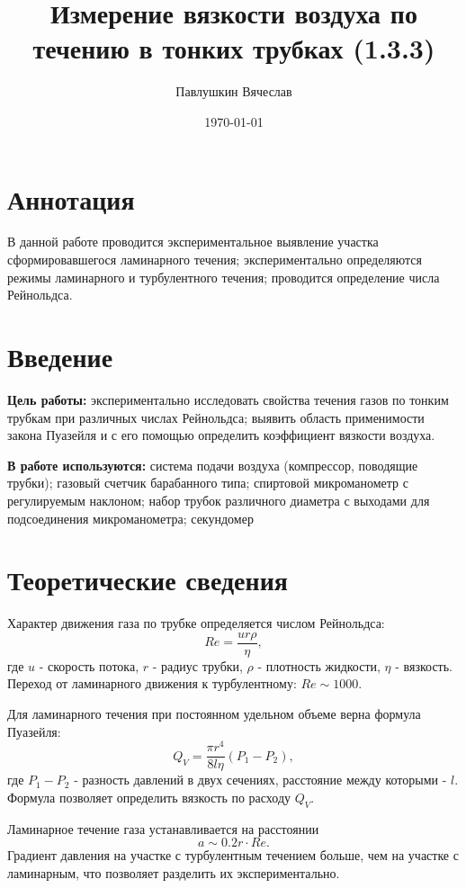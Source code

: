 \documentclass[a4paper,12pt]{article}
\title{Измерение вязкости воздуха по течению в тонких трубках (1.3.3)}
\author{Павлушкин Вячеслав}
\date{\today}
\theoremstyle{definition}
\begin{document}
	\maketitle
	\section{Аннотация}
	В данной работе проводится экспериментальное выявление участка сформировавшегося ламинарного течения; экспериментально определяются режимы ламинарного и турбулентного течения; проводится определение числа Рейнольдса.
	
	\section{Введение}
	
	\noindent\textbf{Цель работы:} экспериментально исследовать свойства течения газов по тонким трубкам при различных числах Рейнольдса; выявить область применимости закона Пуазейля и с его помощью определить коэффициент вязкости воздуха.
	
	
	\bigskip
	\noindent\textbf{В работе используются:} система подачи воздуха (компрессор, поводящие трубки); газовый счетчик барабанного типа; спиртовой микроманометр с регулируемым наклоном; набор трубок различного диаметра с выходами для подсоединения микроманометра; секундомер
		
	\section{Теоретические сведения}
	Характер движения газа по трубке определяется числом Рейнольдса:
	\begin{equation}
		Re = \frac{u r \rho}{\eta},
		\label{eq:Re}
	\end{equation}
	где $u$ - скорость потока, $r$ - радиус трубки, $\rho$ - плотность жидкости, $\eta$ - вязкость. Переход от ламинарного движения к турбулентному: $Re \sim 1000$.
	
	Для ламинарного течения при постоянном удельном объеме верна формула Пуазейля:
	\begin{equation}
		Q_V = \frac{\pi r^4}{8 l \eta}(P_1 - P_2),
		\label{eq:Pu}
	\end{equation}
	где $P_1 - P_2$ - разность давлений в двух сечениях, расстояние между которыми - $l$. Формула позволяет определить вязкость по расходу $Q_V$.
	
	Ламинарное течение газа устанавливается на расстоянии
	\begin{equation}
		a \sim 0.2 r \cdot Re.
		\label{eq:Aa}
	\end{equation}
	Градиент давления на участке с турбулентным течением больше, чем на участке с ламинарным, что позволяет разделить их экспериментально.
	
\end{document}
